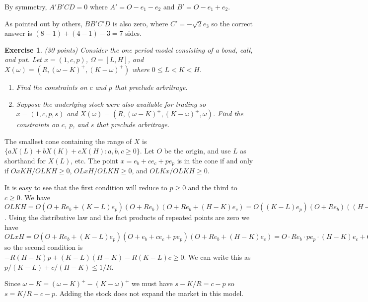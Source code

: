 \documentclass[11pt,fleqn]{amsproc}
\newtheorem{xca}{Exercise}
\begin{document}
By symmetry, $A'B'CD = 0$ where $A' = O - e_1 - e_2$
and $B' = O - e_1 + e_2$. 

As pointed out by others, $BB'C'D$ is also zero, where
$C' = -\sqrt{2} e_3$ so the correct answer is
$(8 - 1) + (4 - 1) - 3 = 7$ sides.

\begin{xca}{(30 points)}
Consider the one period model consisting of a bond, call, and
put. Let $x = (1, c, p)$, $\Omega = [L,H]$, and
$X(\omega) = (R, (\omega - K)^+, (K - \omega)^+)$ where
$0\le L < K < H$.

\begin{enumerate}

\item Find the constraints on $c$ and $p$
that preclude arbritrage.

\item Suppose the underlying stock were also available
for trading so $x = (1, c, p, s)$ and
$X(\omega) = (R, (\omega - K)^+, (K - \omega)^+, \omega)$.
Find the constraints on $c$, $p$, and $s$
that preclude arbritrage.

\end{enumerate}
\end{xca}

The smallest cone containing the range of $X$ is
$\{aX(L) + bX(K) + cX(H)\colon a,b,c\ge 0\}$.
Let $O$ be the origin, and use $L$ as shorthand for $X(L)$, etc.
The point $x = e_b + ce_c + pe_p$ is in the cone if and
only if $OxKH/OLKH \ge 0$, $OLxH/OLKH \ge 0$, and $OLKx/OLKH \ge 0$.

It is easy to see that the first condition will reduce to $p \ge 0$ and
the third to $c \ge 0$. We have $OLKH =
O(O + Re_b + (K - L)e_p)(O + Re_b)(O + Re_b + (H - K)e_c)
= O((K - L)e_p)(O + Re_b)((H - K)e_c)
= O(K - L)e_p Re_b (H - K)e_c
= (K-L)R(H-K)Oe_pe_be_c$.
Using the distributive law and the fact products of repeated
points are zero we have $OLxH =
O(O + Re_b + (K - L)e_p)(O + e_b + ce_c + pe_p)(O + Re_b + (H - K)e_c)
= O\cdot Re_b\cdot pe_p\cdot (H - K)e_c
+ O\cdot (K - L)e_p\cdot e_b\cdot (H - K)e_c
+ O\cdot (K - L)e_p\cdot ce_c\cdot Re_b
= R(H - K)pOe_be_pe_c + (K - L)(H - K)Oe_pe_be_c + R(K-L)cOe_pe_ce_b$
so the second condition is $-R(H - K)p + (K - L)(H - K) - R(K - L)c \ge0$.
We can write this as $p/(K - L) + c/(H - K) \le 1/R$.

Since $\omega - K = (\omega - K)^+ - (K - \omega)^+$ we must
have $s - K/R = c - p$ so $s = K/R + c - p$. Adding the stock
does not expand the market in this model.
\end{document}
